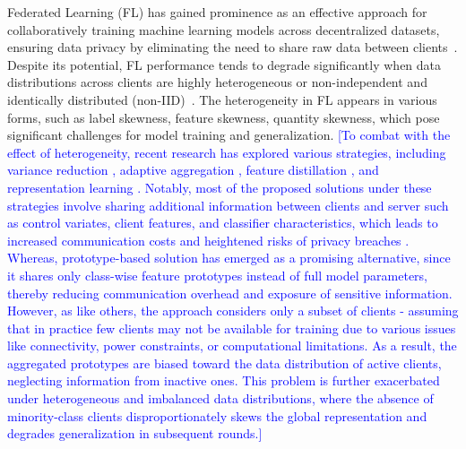 \documentclass[lettersize,journal]{IEEEtran}
\newcommand{\todoa}[1]{\textcolor{blue}{[#1]}}
\begin{document}
Federated Learning (FL) has gained prominence as an effective approach for collaboratively training machine learning models across decentralized datasets, ensuring data privacy by eliminating the need to share raw data between clients~\cite{mcmahan2017communication}. Despite its potential, FL performance tends to degrade significantly when data distributions across clients are highly heterogeneous or non-independent and identically distributed (non-IID)~\cite{zhao2018federated}. The heterogeneity in FL appears in various forms, such as label skewness, feature skewness, quantity skewness, which pose significant challenges for model training and generalization.
\todoa{To combat with the effect of heterogeneity, recent research has explored various strategies, including variance reduction \cite{acar2021federated, karimireddy2020scaffold}, adaptive aggregation \cite{hsu2019measuring, fedadam, fednova, reddi2021adaptive, chen2023elastic, Chen_2023_CVPR}, feature distillation \cite{yang2023fedfed}, and representation learning \cite{zhang2020federated, tan2022federated, liu2024federated}. Notably, most of the proposed solutions under these strategies involve sharing  additional information between clients and server such as control variates, client features, and classifier characteristics, which leads to increased communication costs and heightened risks of privacy breaches \cite{nasr2019comprehensive,melis2019exploiting, wang2019beyond}. Whereas, prototype-based solution \cite{tan2022fedproto} has emerged as a promising alternative, since it shares only class-wise feature prototypes instead of full model parameters, thereby reducing communication overhead and exposure of sensitive information. However, as like others, the approach considers only a subset of clients - assuming that in practice few clients may not be available for training due to various issues like connectivity, power constraints, or computational limitations. As a result, the aggregated prototypes are biased toward the data distribution of active clients, neglecting information from inactive ones. This problem is further exacerbated under heterogeneous and imbalanced data distributions, where the absence of minority-class clients disproportionately skews the global representation and degrades generalization in subsequent rounds.}

\end{document}
